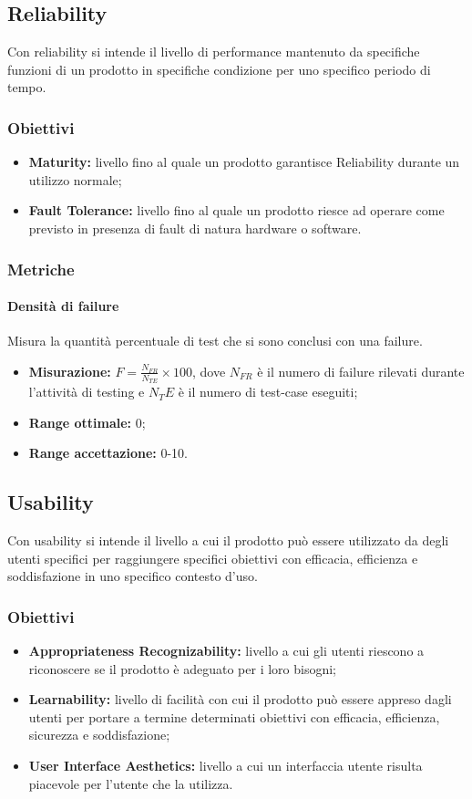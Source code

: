 	\subsection{Reliability}
		Con reliability si intende il livello di performance mantenuto da specifiche funzioni di un prodotto in specifiche condizione per uno specifico periodo di tempo.
		\subsubsection{Obiettivi}
		\begin{itemize}
			\item {\textbf{Maturity:} livello fino al quale un prodotto garantisce Reliability durante un utilizzo normale;}
			\item {\textbf{Fault Tolerance:} livello fino al quale un prodotto riesce ad operare come previsto in presenza di fault di natura hardware o software.}
		\end{itemize}
		\subsubsection{Metriche}
			\paragraph{Densità di failure} \Spazio
			Misura la quantità percentuale di test che si sono conclusi con una failure.
			\begin{itemize}
				\item {\textbf{Misurazione:} $F=\frac{N_{FR}}{N_{TE}}\times 100$, dove $N_{FR}$ è il numero di failure rilevati durante l'attività di testing e ${N_TE}$ è il numero di test-case eseguiti};
				\item {\textbf{Range ottimale:} 0;}
				\item {\textbf{Range accettazione:} 0-10.}
			\end{itemize} 
			
	\subsection{Usability}
		Con usability si intende il livello a cui il prodotto può essere utilizzato da degli utenti specifici per raggiungere specifici obiettivi con efficacia, efficienza e soddisfazione in uno specifico contesto d'uso.  
		\subsubsection{Obiettivi}
		\begin{itemize}
			\item {\textbf{Appropriateness Recognizability:} livello a cui gli utenti riescono a riconoscere se il prodotto è adeguato per i loro bisogni;}
			\item {\textbf{Learnability:} livello di facilità con cui il prodotto può essere appreso dagli utenti per portare a termine determinati obiettivi con efficacia, efficienza, sicurezza e soddisfazione;} 
			\item {\textbf{User Interface Aesthetics:} livello a cui un interfaccia utente risulta piacevole per l'utente che la utilizza. }
			
		\end{itemize}
